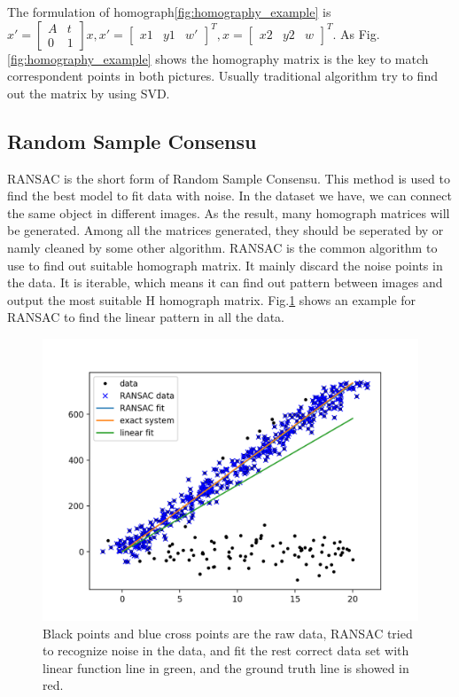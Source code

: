 \documentclass[senior]{IPSstyle}
\begin{document}
The formulation of homograph\ref{fig:homography_example} is $x' = \begin{bmatrix} A & t \\ 0 & 1 \end{bmatrix} x, x'= \begin{bmatrix} x1 & y1 & w' \end{bmatrix}^{T}, x= \begin{bmatrix} x2 & y2 & w \end{bmatrix}^{T}$.
As Fig.\ref{fig:homography_example} shows the homography matrix is the key to match correspondent points in both pictures.
Usually traditional algorithm try to find out the matrix by using SVD\cite{essig2010fully}.

\subsection{Random Sample Consensu}
RANSAC is the short form of Random Sample Consensu\cite{wiki:RANSAC}.
This method is used to find the best model to fit data with noise.
In the dataset we have, we can connect the same object in different images.
As the result, many homograph matrices will be generated.
Among all the matrices generated, they should be seperated by or namly cleaned by some other algorithm.
RANSAC is the common algorithm to use to find out suitable homograph matrix.
It mainly discard the noise points in the data.
It is iterable, which means it can find out pattern between images and output the most suitable H homograph matrix.
Fig.\ref{fig:RANSAC} shows an example for RANSAC to find the linear pattern in all the data.

\begin{figure}[h!]
    \centering
    \includegraphics[width=15cm]{MasterThesis-master/images/RANSAC.png}
    \caption{Black points and blue cross points are the raw data, RANSAC tried to recognize noise in the data, and fit the rest correct data set with linear function line in green, and the ground truth line is showed in red.}
    \label{fig:RANSAC}
\end{figure}
\end{document}
